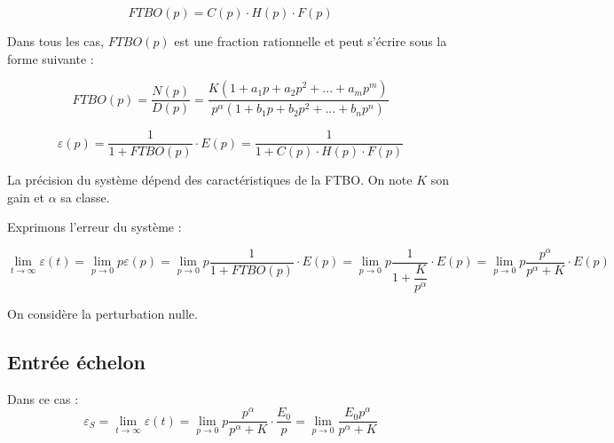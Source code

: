 \documentclass[10pt,oneside]{article}
\begin{document}
$$
FTBO(p) = C(p) \cdot H(p) \cdot F(p)
$$


Dans tous les cas, $FTBO(p)$ est une fraction rationnelle et peut s'écrire sous la forme suivante : 

$$
FTBO(p)=\dfrac{N(p)}{D(p)}=\dfrac{K\left(1+a_1p +a_2p^2 + ... + a_m p^m \right)}{p^\alpha \left(1+b_1p +b_2p^2 + ... + b_n p^n \right)}
$$


$$
\varepsilon(p)
=\dfrac{1}{1+FTBO(p)} \cdot E(p)
=\dfrac{1}{1+C(p) \cdot H(p) \cdot F(p)} 
$$

\begin{rem}
La précision du système dépend des caractéristiques de la FTBO. On note $K$ son gain et $\alpha$ sa classe.
\end{rem}


Exprimons l'erreur du système :

$$
\lim\limits_{t\to \infty} \varepsilon(t) = \lim\limits_{p\to 0} p \varepsilon(p)
= \lim\limits_{p\to 0} p \dfrac{1}{1+FTBO(p)} \cdot E(p)
= \lim\limits_{p\to 0} p \dfrac{1}{1+\dfrac{K}{p^\alpha}} \cdot E(p)
= \lim\limits_{p\to 0} p \dfrac{p^\alpha}{p^\alpha+K} \cdot E(p)
$$


\begin{exemple}
On considère la perturbation nulle.
\end{exemple}

\subsection{Entrée échelon}
Dans ce cas : 
$$
\varepsilon_S =
\lim\limits_{t\to \infty} \varepsilon(t) 
= \lim\limits_{p\to 0} p \dfrac{p^\alpha}{p^\alpha+K} \cdot \dfrac{E_0}{p}
= \lim\limits_{p\to 0}  \dfrac{E_0 p^\alpha}{p^\alpha+K} 
$$
\end{document}
